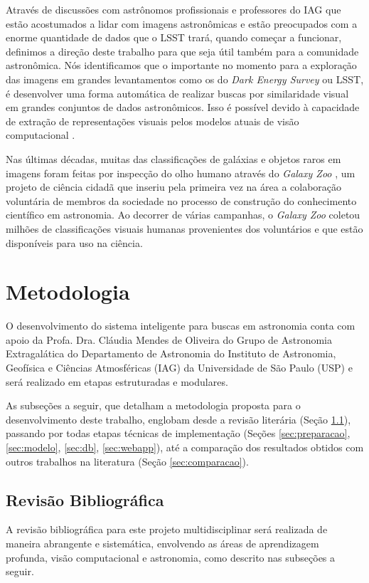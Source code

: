 \documentclass[a4,12pt]{horizon-theme}
\begin{document}
Através de discussões com astrônomos profissionais e professores do IAG que estão acostumados a lidar com imagens astronômicas e estão preocupados com a enorme quantidade de dados que o LSST trará, quando começar a funcionar, definimos a direção deste trabalho para que seja útil também para a comunidade astronômica. Nós identificamos que o importante no momento para a exploração das imagens em grandes levantamentos como os do \emph{Dark Energy Survey} ou LSST, é desenvolver uma forma automática de realizar buscas por similaridade visual em grandes conjuntos de dados astronômicos. Isso é possível devido à capacidade de extração de representações visuais pelos modelos atuais de visão computacional \citep{cnn_representations}.

Nas últimas décadas, muitas das classificações de galáxias e objetos raros em imagens foram feitas por inspecção do olho humano através do \emph{Galaxy Zoo} \citep{galaxyzoo}, um projeto de ciência cidadã \citep{cs-bonney, cs-naturalscience} que inseriu pela primeira vez na área a colaboração voluntária de membros da sociedade no processo de construção do conhecimento científico em astronomia. Ao decorrer de várias campanhas, o \emph{Galaxy Zoo} coletou milhões de classificações visuais humanas provenientes dos voluntários e que estão disponíveis para uso na ciência.




\section{Metodologia}
\label{sec:metodologia}
O desenvolvimento do sistema inteligente para buscas em astronomia conta com apoio da Profa. Dra. Cláudia Mendes de Oliveira do Grupo de Astronomia Extragalática do Departamento de Astronomia do Instituto de Astronomia, Geofísica e Ciências Atmosféricas (IAG) da Universidade de São Paulo (USP) e será realizado em etapas estruturadas e modulares.


As subseções a seguir, que detalham a metodologia proposta para o desenvolvimento deste trabalho, englobam desde a revisão literária (Seção \ref{sec:revisao}), passando por todas etapas técnicas de implementação  (Seções \ref{sec:preparacao}, \ref{sec:modelo}, \ref{sec:db}, \ref{sec:webapp}), até a comparação dos resultados obtidos com outros trabalhos na literatura (Seção \ref{sec:comparacao}).



\subsection{Revisão Bibliográfica}
\label{sec:revisao}
A revisão bibliográfica para este projeto multidisciplinar será realizada de maneira abrangente e sistemática, envolvendo as áreas de aprendizagem profunda, visão computacional e astronomia, como descrito nas subseções a seguir.
\end{document}
